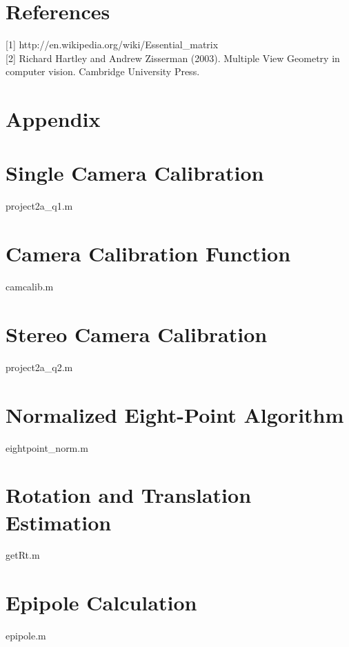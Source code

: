 \documentclass[12pt]{article} %
\begin{document}
\newpage


\section*{References}
[1] http://en.wikipedia.org/wiki/Essential\_matrix\\[12pt]
[2] Richard Hartley and Andrew Zisserman (2003). Multiple View Geometry in computer vision. Cambridge University Press.

\newpage


\section*{Appendix}
\appendix

\section{Single Camera Calibration}
\label{q1}
{project2a_q1.m}

\section{Camera Calibration Function}
\label{camcalib}
{camcalib.m}

\section{Stereo Camera Calibration}
\label{q2}
{project2a_q2.m}

\section{Normalized Eight-Point Algorithm}
\label{eightpoint_norm}
{eightpoint_norm.m}

\section{Rotation and Translation Estimation}
\label{getRt}
{getRt.m}

\section{Epipole Calculation}
\label{epipole}
{epipole.m}
\end{document}
